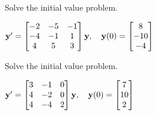 \documentclass{ximera}
\begin{document}
\begin{problem}\label{exer:10.4.25} 
Solve the initial value problem.

$ {\bf y}'= \begin{bmatrix}-2&-5&-1\\-4&-1&1\\4&5&3\end{bmatrix}{\bf y},\quad
{\bf y}(0)= \begin{bmatrix}8\\-10\\-4\end{bmatrix}$
\end{problem}

\begin{problem}\label{exer:10.4.26}  
Solve the initial value problem.

$ {\bf y}'= \begin{bmatrix}3&-1&0\\4&-2&0\\4&-4&2\end{bmatrix}{\bf y},\quad
{\bf y}(0)= \begin{bmatrix}7\\10\\2\end{bmatrix}$


\end{problem}
\end{document}
